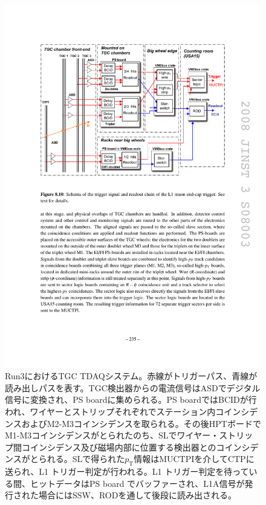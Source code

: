 \begin{figure} 
\centering
\includegraphics[width=16cm]{fig/Intro/TGC_run3tdaq.pdf}
\caption[Run3におけるTGC TDAQシステム]{Run3におけるTGC TDAQシステム。赤線がトリガーパス、青線が読み出しパスを表す。TGC検出器からの電流信号はASDでデジタル信号に変換され、PS boardに集められる。PS boardではBCIDが行われ、ワイヤーとストリップそれぞれでステーション内コインシデンスおよびM2-M3コインシデンスを取られる。その後HPTボードでM1-M3コインシデンスがとられたのち、SLでワイヤー・ストリップ間コインシデンス及び磁場内部に位置する検出器とのコインシデンスがとられる。SLで得られた$p_\mathrm{T}$情報はMUCTPIを介してCTPに送られ、L1 トリガー判定が行われる。L1 トリガー判定を待っている間、ヒットデータはPS board でバッファーされ、L1A信号が発行された場合にはSSW、RODを通して後段に読み出される。}
\label{TGC_run3tdaq}
\end{figure}


